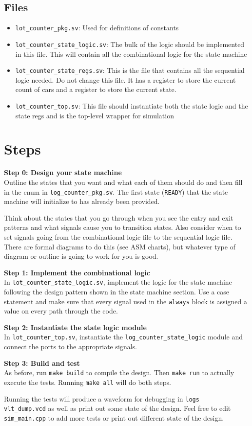\documentclass{article}
\begin{document}
\subsection*{Files}
\begin{itemize}
    \item \texttt{lot\_counter\_pkg.sv}: Used for definitions of constants
    \item \texttt{lot\_counter\_state\_logic.sv}: The bulk of the logic should
    be implemented in this file. This will contain all the combinational logic
    for the state machine
    \item \texttt{lot\_counter\_state\_regs.sv}: This is the file that contains
    all the sequential logic needed. Do not change this file. It has a register
    to store the current count of cars and a register to store the current
    state.
    \item \texttt{lot\_counter\_top.sv}: This file should instantiate both the
    state logic and the state regs and is the top-level wrapper for simulation
\end{itemize}

\section*{Steps}
\textbf{Step 0: Design your state machine}\\
Outline the states that you want and what each of them should do and then fill
in the enum in \texttt{log\_counter\_pkg.sv}. The first state (\texttt{READY})
that the state machine will initialize to has already been provided. 

Think about the states that you go through when you see the entry and exit
patterns and what signals cause you to transition states. Also consider when to
set signals going from the combinational logic file to the sequential logic
file. There are formal diagrams to do this (see ASM charts), but whatever type
of diagram or outline is going to work for you is good.

\noindent\textbf{Step 1: Implement the combinational logic}\\
In \texttt{lot\_counter\_state\_logic.sv}, implement the logic for the state
machine following the design pattern shown in the state machine section. Use a
case statement and make sure that every signal used in the \texttt{always} block
is assigned a value on every path through the code. 

\noindent\textbf{Step 2: Instantiate the state logic module}\\
In \texttt{lot\_counter\_top.sv}, instantiate the
\texttt{log\_counter\_state\_logic} module and connect the ports to the
appropriate signals.

\noindent\textbf{Step 3: Build and test}\\
As before, run \texttt{make build} to compile the design. Then \texttt{make run}
to actually execute the tests. Running \texttt{make all} will do both steps.

Running the tests will produce a waveform for debugging in
\texttt{logs\\vlt\_dump.vcd} as well as print out some state of the design. Feel
free to edit \texttt{sim\_main.cpp} to add more tests or print out different
state of the design.
    
\end{document}
